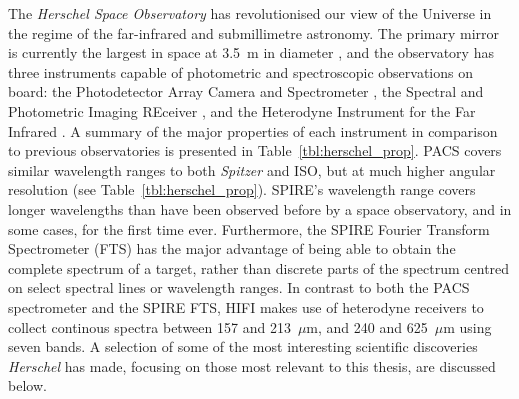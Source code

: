 The \emph{Herschel Space Observatory} has revolutionised our view of the Universe in the regime of the far-infrared and submillimetre astronomy.  The primary mirror is currently the largest in space at 3.5~m in diameter \citep{2010A&A...518L...1P}, and the observatory has three instruments capable of photometric and spectroscopic observations on board: the Photodetector Array Camera and Spectrometer \citep[PACS; ][]{2010A&A...518L...2P}, the Spectral and Photometric Imaging REceiver \citep[SPIRE; ][]{2010A&A...518L...3G}, and the Heterodyne Instrument for the Far Infrared \citep[HIFI; ][]{2010A&A...518L...6D}.  A summary of the major properties of each instrument in comparison to previous observatories is presented in Table~\ref{tbl:herschel_prop}.  PACS covers similar wavelength ranges to both \emph{Spitzer} and ISO, but at much higher angular resolution (see Table~\ref{tbl:herschel_prop}).  SPIRE's wavelength range covers longer wavelengths than have been observed before by a space observatory, and in some cases, for the first time ever.  Furthermore, the SPIRE Fourier Transform Spectrometer (FTS) has the major advantage of being able to obtain the complete spectrum of a target, rather than discrete parts of the spectrum centred on select spectral lines or wavelength ranges.  In contrast to both the PACS spectrometer and the SPIRE FTS, HIFI makes use of heterodyne receivers to collect continous spectra between 157 and 213~$\mu$m, and 240 and 625~$\mu$m using seven bands.  A selection of some of the most interesting scientific discoveries \emph{Herschel} has made, focusing on those most relevant to this thesis, are discussed below.

